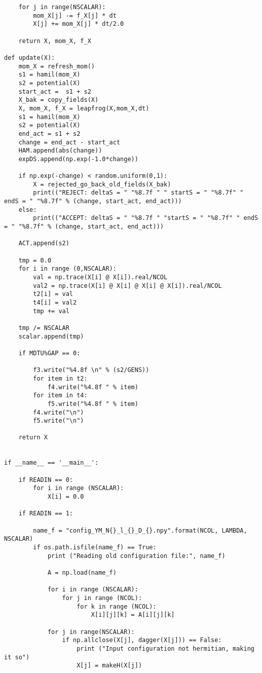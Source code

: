 \begin{lstlisting}
    for j in range(NSCALAR):
        mom_X[j] -= f_X[j] * dt
        X[j] += mom_X[j] * dt/2.0
    
    return X, mom_X, f_X

def update(X):
    mom_X = refresh_mom()
    s1 = hamil(mom_X)
    s2 = potential(X)
    start_act =  s1 + s2
    X_bak = copy_fields(X) 
    X, mom_X, f_X = leapfrog(X,mom_X,dt)
    s1 = hamil(mom_X)
    s2 = potential(X)
    end_act = s1 + s2
    change = end_act - start_act
    HAM.append(abs(change))
    expDS.append(np.exp(-1.0*change))   

    if np.exp(-change) < random.uniform(0,1):
        X = rejected_go_back_old_fields(X_bak)
        print(("REJECT: deltaS = " "%8.7f " " startS = " "%8.7f" " endS = " "%8.7f" % (change, start_act, end_act)))
    else:   
        print(("ACCEPT: deltaS = " "%8.7f " "startS = " "%8.7f" " endS = " "%8.7f" % (change, start_act, end_act)))

    ACT.append(s2)

    tmp = 0.0 
    for i in range (0,NSCALAR):
        val = np.trace(X[i] @ X[i]).real/NCOL
        val2 = np.trace(X[i] @ X[i] @ X[i] @ X[i]).real/NCOL
        t2[i] = val 
        t4[i] = val2 
        tmp += val 

    tmp /= NSCALAR 
    scalar.append(tmp) 

    if MDTU%GAP == 0:

        f3.write("%4.8f \n" % (s2/GENS))
        for item in t2:
            f4.write("%4.8f " % item)
        for item in t4:
            f5.write("%4.8f " % item)
        f4.write("\n")
        f5.write("\n") 

    return X


if __name__ == '__main__':

    if READIN == 0:
        for i in range (NSCALAR):  
            X[i] = 0.0  

    if READIN == 1:

        name_f = "config_YM_N{}_l_{}_D_{}.npy".format(NCOL, LAMBDA, NSCALAR)
        if os.path.isfile(name_f) == True: 
            print ("Reading old configuration file:", name_f)
            
            A = np.load(name_f)

            for i in range (NSCALAR):
                for j in range (NCOL):
                    for k in range (NCOL):
                        X[i][j][k] = A[i][j][k] 

            for j in range(NSCALAR):
                if np.allclose(X[j], dagger(X[j])) == False:
                    print ("Input configuration not hermitian, making it so")
                    X[j] = makeH(X[j])


\end{lstlisting}
